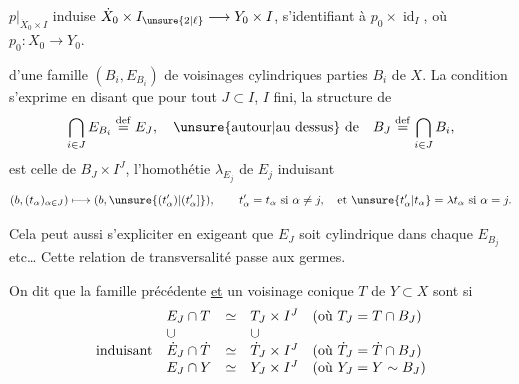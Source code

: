 $p|_{\dot X_0\times I}$ induise $\dot X_0\times I_{\unsure{2|\ell}}\longrightarrow Y_0\times I$,
s'identifiant à $p_0\times\operatorname{id}_I$, où $p_0:X_0\longrightarrow Y_0$.

 d'une famille 
$(B_i,E_{B_i})$ de voisinages cylindriques  parties $B_i$ de $X$.
La condition s'exprime en disant que pour
tout $J\subset I$, $I$ fini, la structure de
\[
\bigcap_{i\in J}E_{B_i}\overset{\mathrm{def}}=E_J,
\quad\text{\unsure{autour|au dessus} de}\quad
B_J\overset{\mathrm{def}}=\bigcap_{i\in J}B_i,
\]
est celle de $B_J\times I^J$, l'homothétie
$\lambda_{E_j}$ de $E_j$  induisant
\[
(b,(t_\alpha)_{\alpha\in J})\longmapsto(b,\unsure{(t'_\alpha)|(t'_\alpha]}),
\qquad
t'_\alpha=t_\alpha\ \text{si }\alpha\ne j,\quad
\text{et }\unsure{t'_\alpha|t_\alpha}=\lambda t_\alpha\ \text{si }\alpha=j.
\]

Cela peut aussi s'expliciter en exigeant
que $E_J$ soit cylindrique dans chaque $E_{B_j}$ etc\ldots
Cette relation de transversalité passe aux germes.

On dit que la famille précédente \uline{et}
un voisinage conique $T$ de $Y\subset X$ sont
 
si 
\[
\begin{array}{l@{\quad}lcl@{\quad}l}
& E_J\cap T & \simeq & T_J\times I^J
& (\text{où }T_J=T\cap B_J)\\
&\cup&&\cup&\\
\text{induisant}&\dot E_J\cap\dot T&\simeq&\dot T_J\times I^J
&(\text{où }\dot T_J=\dot T\cap B_J)\\
&E_J\cap Y&\simeq&Y_J\times I^J
&(\text{où }Y_J=Y\sim B_J)
\end{array}
\]
